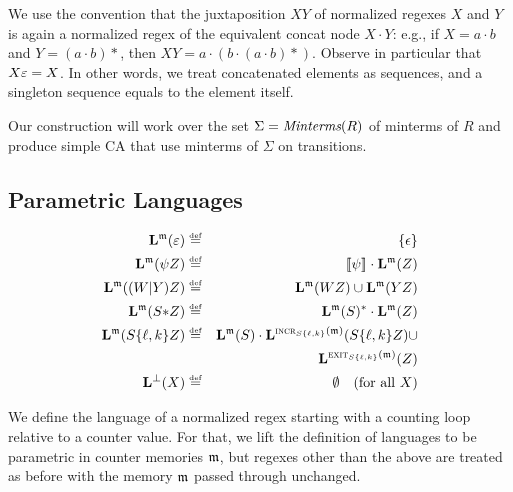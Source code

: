 \documentclass[acmsmall,screen]{acmart}
\begin{document}
We use the convention that the juxtaposition $XY$ of normalized regexes $X$ and
$Y$ is again a normalized regex of the equivalent concat node $X\cdot Y$: e.g.,
if $X=a\cdot b$ and $Y=(a\cdot b){*}$, then $XY =a\cdot (b\cdot (a \cdot
b){*})$. Observe in particular that $X\varepsilon = X$. In other words, we treat
concatenated elements as sequences, and a singleton sequence equals to the
element itself.

Our construction will work over the set $\Sigma=\textit{Minterms}(R)$ of minterms of $R$ and produce simple CA that use minterms of $\Sigma$ on transitions. 

\subsection{Parametric Languages}

\begin{figure}
\hspace*{-4mm}\begin{minipage}{84mm}
\vspace*{-6mm}
\begin{eqnarray}
  \label{eq:EPS} \LANG{\mem}{\emp} &\eqdef & \{\eps\} \\
  \LANG{\mem}{\psi Z} & \eqdef & \den{\psi}\cdot\LANG{\mem}{Z} \\
  \LANG{\mem}{(W|Y) Z} &\eqdef &  \LANG{\mem}{WZ} \cup  \LANG{\mem}{YZ} \\
  \label{eq:STAR} \LANG{\mem}{S{*}Z} &\eqdef & \LANG{\mem}{S}^* \cdot\LANG{\mem}{Z}\\
  \label{eq:COUNTING} \LANG{\mem}{S\{\ell,k\}Z} &\eqdef& 
    \LANG{\mem}{S}\cdot\LANG{\IncrOp[S\{\ell,k\}](\mem)}{S\{\ell,k\}Z} \cup\\
    \nonumber & & \LANG{\ExitOp[S\{\ell,k\}](\mem)}{Z} \\
  \label{eq:BOT} \LANG{\bot}{X}&\eqdef& \emptyset \quad (\textrm{for all $X$})
\end{eqnarray}
\end{minipage}
\end{figure}
%
We define the language of a normalized regex starting with a counting loop
relative to a counter value. For that, we lift the definition of languages to be
parametric in counter memories $\mathfrak{m}$, but regexes other than the above are
treated as before with the memory $\mathfrak{m}$ passed through unchanged.
\end{document}
